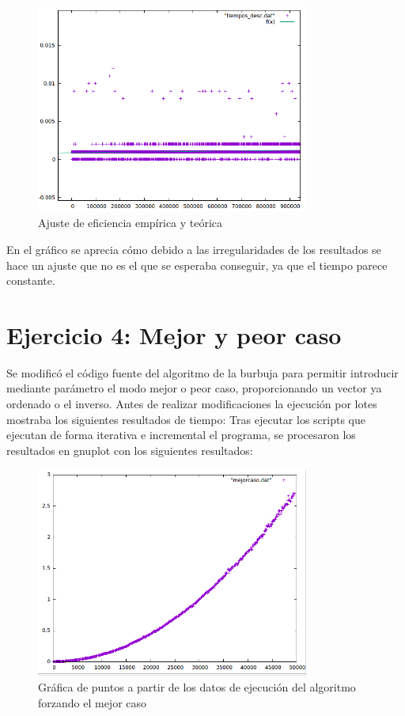 \documentclass[paper=a4, fontsize=10pt]{scrartcl} %
\begin{document}
\begin{figure}[H] %
	\centering
	\label{lsblk}
	\includegraphics[width=0.8\textwidth]{../imgs/ejercicio3c.PNG}
	\caption{Ajuste de eficiencia empírica y teórica} 
\end{figure}

En el gráfico se aprecia cómo debido a las irregularidades de los resultados se hace un ajuste que no es el que se esperaba conseguir, ya que el tiempo parece constante.

\section{Ejercicio 4:  Mejor y peor caso}
Se modificó el código fuente del algoritmo de la burbuja para permitir introducir mediante parámetro el modo mejor o peor caso, proporcionando un vector ya ordenado o el inverso.
Antes de realizar modificaciones la ejecución por lotes mostraba los siguientes resultados de tiempo:
Tras ejecutar los scripts que ejecutan de forma iterativa e incremental el programa, se procesaron los resultados en gnuplot con los siguientes resultados:

\begin{figure}[H] %
	\centering
	\label{lsblk}
	\includegraphics[width=0.8\textwidth]{../imgs/ejercicio4a.PNG}
	\caption{Gráfica de puntos a partir de los datos de ejecución del algoritmo forzando el mejor caso} 
\end{figure}
\end{document}

